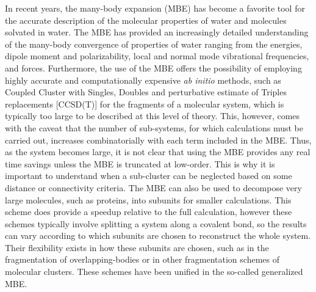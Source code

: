 \documentclass[11pt, proquest]{uwthesis}[2020/02/24]
\begin{document}
\par In recent years, the many-body expansion (MBE) has become a favorite tool for the accurate description of the molecular properties of water and molecules solvated in water. The MBE has provided an increasingly detailed understanding of the many-body convergence of properties of water ranging from the energies\autocite{xantheas_ab_1994, pedulla_theoretical_1998}, dipole moment and polarizability\autocite{medders_many-body_2013}, local and normal mode vibrational frequencies\autocite{heindel_origin_2018, howard_n-body_2013}, and forces\autocite{bates_efficient_2011, demerdash_convergence_2016, demerdash_assessing_2017}. Furthermore, the use of the MBE offers the possibility of employing highly accurate and computationally expensive \textit{ab initio} methods, such as Coupled Cluster with Singles, Doubles and perturbative estimate of Triples replacements [CCSD(T)] for the fragments of a molecular system, which is typically too large to be described at this level of theory. This, however, comes with the caveat that the number of sub-systems, for which calculations must be carried out, increases combinatorially with each term included in the MBE. Thus, as the system becomes large, it is not clear that using the MBE provides any real time savings unless the MBE is truncated at low-order. This is why it is important to understand when a sub-cluster can be neglected based on some distance or connectivity criteria.\autocite{cui_theoretical_2006, ouyang_when_2016} The MBE can also be used to decompose very large molecules, such as proteins, into subunits for smaller calculations.\autocite{mayhall_many-overlapping-body_2012, richard_many-body_2013} This scheme does provide a speedup relative to the full calculation, however these schemes typically involve splitting a system along a covalent bond, so the results can vary according to which subunits are chosen to reconstruct the whole system. Their flexibility exists in how these subunits are chosen, such as in the fragmentation of overlapping-bodies or in other fragmentation schemes of molecular clusters. These schemes have been unified in the so-called generalized MBE.\autocite{richard_generalized_2012}
\end{document}
